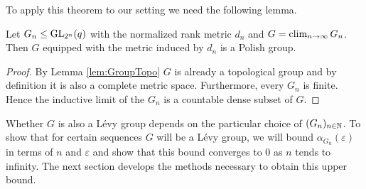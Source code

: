 To apply this theorem to our setting we need the following lemma.
\begin{lemma}
Let $G_n\leq\operatorname{GL}_{2^n}(q)$ with the normalized rank metric $d_n$ and $G=\operatorname{clim}\limits_{n\to\infty} G_n$. Then $G$ equipped with the metric induced by $d_n$ is a Polish group. 
\end{lemma}
\begin{proof}
By Lemma \ref{lem:GroupTopo} $G$ is already a topological group and by definition it is also a complete metric space. Furthermore, every $G_n$ is finite. Hence the inductive limit of the $G_n$ is a countable dense subset of $G$.
\end{proof}

Whether $G$ is also a L\'evy group depends on the particular choice of $(G_n)_{n\in\mathbb{N}}$. 
To show that for certain sequences $G$ will be a L\'evy group, we will bound $\alpha_{G_n}(\varepsilon)$ in terms of $n$ and $\varepsilon$ and show that this bound converges to 0 as $n$ tends to infinity. 
The next section develops the methods necessary to obtain this upper bound.

